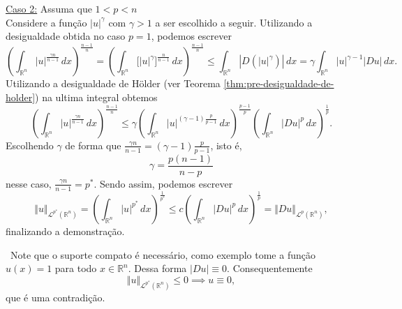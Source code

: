 \documentclass[a4paper, 11pt]{book}
\theoremstyle{definition}
\newcommand{\obs}{\noindent{\textbf{\textcolor{black}{\sffamily Observação:}}}~}
\newcommand{\bR}{\mathbb{R}}
\newcommand{\cL}{\mathcal{L}}
\begin{document}
\begin{prf}
    \underline{Caso 2:} Assuma que $1 < p < n$\\
    Considere a função $|u|^\gamma$ com $\gamma > 1$ a ser escolhido a seguir. Utilizando a desigualdade obtida no caso $p = 1$, podemos escrever
    \[
        \left( \int_{\bR^n} |u|^{\frac{\gamma n}{n - 1}}  \, dx\right)^{\frac{n-1}{n}} = \left( \int_{\bR^n} \Big[ |u|^\gamma \Big]^{\frac{n}{n-1}} \,dx \right)^{\frac{n-1}{n}} \leqslant \int_{\bR^n} |D(|u|^{\gamma})| \,dx = \gamma \int_{\bR^n} |u|^{\gamma-1} |Du| \,dx.
    \]
    Utilizando a desigualdade de Hölder (ver Teorema \ref{thm:pre-desigualdade-de-holder}) na ultima integral obtemos
    \[
        \left( \int_{\bR^n} |u|^{\frac{\gamma n}{n - 1}}  \, dx\right)^{\frac{n-1}{n}} \leqslant \gamma\left( \int_{\bR^n} |u|^{(\gamma-1)\frac{p}{p-1}} \,dx \right)^{\frac{p-1}{p}} \left( \int_{\bR^n} |Du|^p \,dx \right)^{\frac{1}{p}}.
    \]
    Escolhendo $\gamma$ de forma que $\displaystyle\frac{\gamma n}{n - 1} = (\gamma -1)\frac{p}{p-1}$, isto é,
    \[
        \gamma = \frac{p(n-1)}{n-p}
    \]
    nesse caso, $\displaystyle\frac{\gamma n}{n-1} = p^*$. Sendo assim, podemos escrever
    \[
        \Vert u \Vert_{\cL^{p^*}(\bR^n)} = \left( \int_{\bR^n} |u|^{p^*} \,dx \right)^{\frac{1}{p^*}} \leqslant c \left( \int_{\bR^n} |Du|^p \,dx\right)^{\frac{1}{p}} = \Vert Du \Vert_{\cL^p(\bR^n)},
    \]
    finalizando a demonstração.
\end{prf}

\obs Note que o suporte compato é necessário, como exemplo tome a função $u(x) = 1$ para todo $x \in \bR^n$. Dessa forma $|Du| \equiv 0$. Consequentemente
\[
    \Vert u \Vert_{\cL^{p^*}(\bR^n)} \leqslant 0 \implies u \equiv 0,
\]
que é uma contradição.
\end{document}

